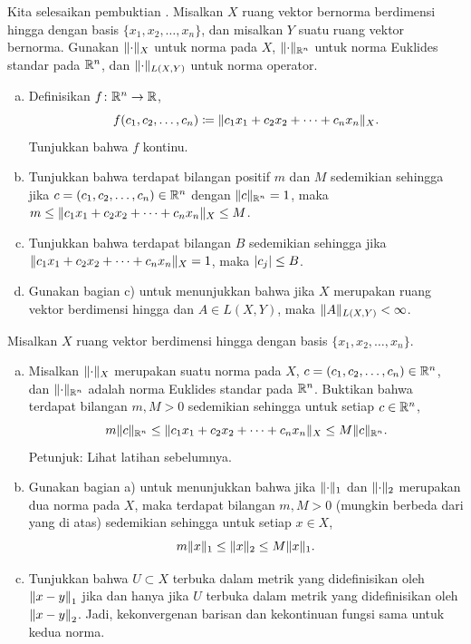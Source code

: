 \begin{exercise}
\pagebreak[1]
Kita selesaikan pembuktian .
Misalkan $X$ ruang vektor bernorma berdimensi hingga dengan basis
$\{ x_1,x_2,\ldots,x_n \}$, dan misalkan $Y$ suatu ruang vektor bernorma. Gunakan $\lVert {\cdot} \rVert_X$ untuk norma pada $X$,
$\lVert {\cdot} \rVert_{{\mathbb{R}}^n}$ untuk norma Euklides standar pada ${\mathbb{R}}^n$, dan
$\lVert {\cdot} \rVert_{L(X,Y)}$ untuk norma operator.
\begin{enumerate}[a)]
\item
Definisikan $f \colon {\mathbb{R}}^n \to {\mathbb{R}}$,
\begin{equation*}
f(c_1,c_2,\ldots,c_n) \coloneqq 
\lVert {c_1 x_1 + c_2 x_2 + \cdots + c_n x_n} \rVert_X .
\end{equation*}
Tunjukkan bahwa $f$ 
kontinu.
\item
Tunjukkan bahwa terdapat bilangan positif $m$ dan $M$ sedemikian
sehingga jika $c = (c_1,c_2,\ldots,c_n) \in {\mathbb{R}}^n$ dengan
$\lVert {c} \rVert_{{\mathbb{R}}^n} = 1$, maka 
$m \leq \lVert {c_1 x_1 + c_2 x_2 + \cdots + c_n x_n} \rVert_X \leq M$.
\item
Tunjukkan bahwa terdapat bilangan $B$ sedemikian sehingga jika
$\lVert {c_1 x_1 + c_2 x_2 + \cdots + c_n x_n} \rVert_X = 1$,
maka $\lvert {c_j} \rvert \leq B$.
\item
Gunakan bagian c) untuk menunjukkan bahwa jika $X$ merupakan ruang vektor 
berdimensi hingga dan $A \in L(X,Y)$, maka $\lVert {A} \rVert_{L(X,Y)} < \infty$.
\end{enumerate}
\end{exercise}

\begin{exercise} \label{exercise:allnormsequiv}
\pagebreak[3]
Misalkan $X$ ruang vektor berdimensi hingga dengan basis
$\{ x_1,x_2,\ldots,x_n \}$.
\begin{enumerate}[a)]
\item
Misalkan $\lVert {\cdot} \rVert_X$ merupakan suatu norma pada $X$,
$c = (c_1,c_2,\ldots,c_n) \in {\mathbb{R}}^n$,
dan $\lVert {\cdot} \rVert_{{\mathbb{R}}^n}$ adalah
norma Euklides standar pada ${\mathbb{R}}^n$.
Buktikan bahwa terdapat bilangan $m,M > 0$ sedemikian sehingga
untuk setiap $c \in {\mathbb{R}}^n$,
\begin{equation*}
m \lVert {c} \rVert_{{\mathbb{R}}^n}
\leq
\lVert {c_1 x_1 + c_2 x_2 + \cdots + c_n x_n} \rVert_X
\leq
M \lVert {c} \rVert_{{\mathbb{R}}^n} .
\end{equation*}
Petunjuk: Lihat latihan sebelumnya.
\item
Gunakan bagian a) untuk menunjukkan bahwa jika
$\lVert {\cdot} \rVert_1$ dan
$\lVert {\cdot} \rVert_2$ merupakan dua norma pada $X$, maka terdapat
bilangan $m,M > 0$ (mungkin berbeda dari yang di atas) sedemikian sehingga
untuk setiap $x \in X$,
\begin{equation*}
m \lVert {x} \rVert_1
\leq
\lVert {x} \rVert_2
\leq
M \lVert {x} \rVert_1 .
\end{equation*}
\item
Tunjukkan bahwa $U \subset X$ terbuka dalam metrik yang didefinisikan oleh
$\left\lVert {x-y} \right\rVert_1$ jika dan hanya jika $U$ terbuka dalam metrik yang didefinisikan oleh
$\left\lVert {x-y} \right\rVert_2$.  Jadi, kekonvergenan barisan dan kekontinuan
fungsi sama untuk kedua norma.
\end{enumerate}
\end{exercise}

